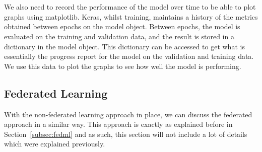 \documentclass[12pt]{article}
\begin{document}
\\\\
We also need to record the performance of the model over time to be able to plot graphs using matplotlib. Keras, whilst training, maintains a history of the metrics obtained between epochs on the model object. Between epochs, the model is evaluated on the training and validation data, and the result is stored in a dictionary in the model object. This dictionary can be accessed to get what is essentially the progress report for the model on the validation and training data. We use this data to plot the graphs to see how well the model is performing. 
\subsection{Federated Learning}\label{subsec:fedml-core}
With the non-federated learning approach in place, we can discuss the federated approach in a similar way. This approach is exactly as explained before in Section~\ref{subsec:fedml} and as such, this section will not include a lot of details which were explained previously. 
\end{document}
